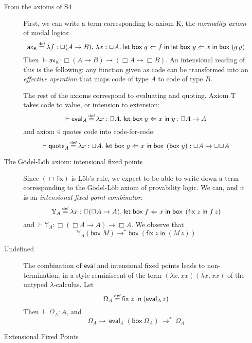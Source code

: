 \documentclass[11pt]{entcs}
\newcommand{\defeq}{\stackrel{\mathclap{\mbox{\tiny def}}}{=}}
\newcommand{\ibox}[1]{\mathsf{box\;}#1}
\newcommand{\letbox}[3]{\mathsf{let\;box\;} #1 \Leftarrow #2 \mathsf{\;in\;} #3}
\newcommand{\fixlob}[2]{\mathsf{fix\;} #1 \mathsf{\;in\;} #2}
\newcommand{\red}{\mathrel{\longrightarrow}}
\newcommand{\redt}{\mathrel{\longrightarrow^\ast}}
\begin{document}
\begin{description}

\item[From the axioms of \textsf{S4}]

First, we can write a term corresponding to axiom \textsf{K}, the
\emph{normality axiom} of modal logics: \[
  \mathsf{ax_K} \defeq
    \lambda f : \Box (A \rightarrow B). \;
    \lambda x : \Box A . \;
      \letbox{g}{f}{\letbox{y}{x}{\ibox{(g\,y)}}}
\]
Then $\vdash \mathsf{ax_K} : \Box(A \rightarrow B) \rightarrow
(\Box A \rightarrow \Box B)$. An intensional reading of this is
the following: any function given as code can be transformed into
an \emph{effective operation} that maps code of type $A$ to code
of type $B$.

The rest of the axioms correspond to evaluating and quoting.
Axiom \textsf{T} takes code to value, or intension to extension:
\[
  \vdash \mathsf{eval}_A \defeq
    \lambda x : \Box A. \; \letbox{y}{x}{y}
      : \Box A \rightarrow A
\] and axiom \textsf{4} quotes code into code-for-code: \[
  \vdash \mathsf{quote}_A \defeq
    \lambda x : \Box A. \;
      \letbox{y}{x}{\ibox{\left(\ibox{y}\right)}}
    : \Box A \rightarrow \Box \Box A
\]

\item[The G\"odel-L\"ob axiom: intensional fixed points]

Since $(\Box\textsf{fix})$ is L\"ob's rule, we expect to be able
to write down a term corresponding to the G\"odel-L\"ob axiom of
provability logic. We can, and it is an \emph{intensional
fixed-point combinator}: \[
  \mathbb{Y}_A \defeq
    \lambda x : \Box (\Box A \rightarrow A). \;
      \letbox{f}{x}{
          \ibox{\left(\fixlob{z}{f\,z}\right)}
      }
\] and $\vdash \mathbb{Y}_A : \Box(\Box A \rightarrow A)
\rightarrow \Box A$. We observe that \[
  \mathbb{Y}_A(\ibox{M})
    \redt{}
  \ibox{\left(\fixlob{z}{(M\, z)}\right)}
\]

\item[Undefined]

The combination of $\textsf{eval}$ and intensional fixed points
leads to non-termination, in a style reminiscent of the term
$(\lambda x.\,xx)(\lambda x.\,xx)$ of the untyped
$\lambda$-calculus. Let \[
  \Omega_A \defeq \fixlob{z}{(\textsf{eval}_A\,z)}
\] Then $\vdash \Omega_A : A$, and \[
  \Omega_A
    \red{}\
  \textsf{eval}_A\;\left(\ibox{\Omega_A}\right)\
    \redt{}\
  \Omega_A
\]

\item[Extensional Fixed Points]


\end{description}
\end{document}
